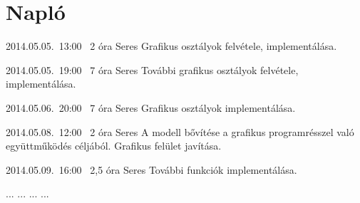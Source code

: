 %
\section{Napló}

\begin{naplo}

\bejegyzes
{2014.05.05.~13:00~}
{2 óra}
{Seres}
{Grafikus osztályok felvétele, implementálása.}

\bejegyzes
{2014.05.05.~19:00~}
{7 óra}
{Seres}
{További grafikus osztályok felvétele, implementálása.}

\bejegyzes
{2014.05.06.~20:00~}
{7 óra}
{Seres}
{Grafikus osztályok implementálása.}

\bejegyzes
{2014.05.08.~12:00~}
{2 óra}
{Seres}
{A modell bővítése a grafikus programrésszel való együttműködés céljából. Grafikus felület javítása.}

\bejegyzes
{2014.05.09.~16:00~}
{2,5 óra}
{Seres}
{További funkciók implementálása.}


\bejegyzes
{...}
{...}
{...}
{...}


\end{naplo}

